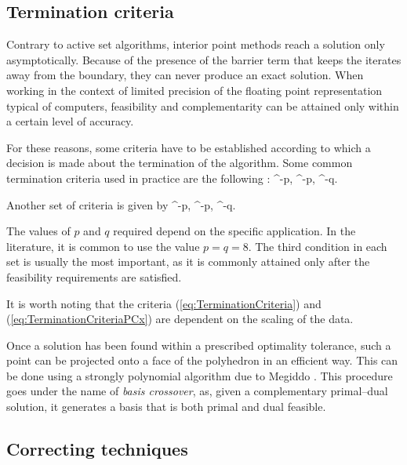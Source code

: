 %
%
\subsection{Termination criteria}

Contrary to active set algorithms, interior point methods reach a
solution only asymptotically. 
Because of the presence of the barrier term that keeps the iterates
away from the boundary, they can never produce an exact solution.
When working in the context of limited precision of the
floating point representation typical of computers, feasibility and
complementarity can be attained only within a certain level
of accuracy.

For these reasons, some criteria have to be established according
to which a decision is made about the termination of the algorithm.
Some common termination criteria used in practice are the
following \cite{GondzioTerlaky}:
\be  \label{eq:TerminationCriteria}
  ^{-p}, 
\qquad
{}  ^{-p},
\qquad
{}  ^{-q}.
\ee

Another set of criteria is given by
\be  \label{eq:TerminationCriteriaPCx}
 ^{-p},
\qquad
{} ^{-p},
\qquad
{} ^{-q}.
\ee

The values of $p$ and $q$ required depend on the specific application.
In the literature, it is common to use the value $p = q = 8$.
The third condition in each set is usually the most important, as it is
commonly attained only after the feasibility requirements are satisfied.

It is worth noting that the criteria (\ref{eq:TerminationCriteria})
and (\ref{eq:TerminationCriteriaPCx})
are dependent on the scaling of the data.

Once a solution has been found within a prescribed 
optimality tolerance, such a point can be projected onto a face 
of the polyhedron in an efficient way.
This can be done using a strongly polynomial algorithm due
to Megiddo \cite{Megiddo91}. This procedure goes under the name
of {\em basis crossover}, 
as, given a complementary primal--dual solution, it generates a basis 
that is both primal and dual feasible.

%
%
\subsection{Correcting techniques}

